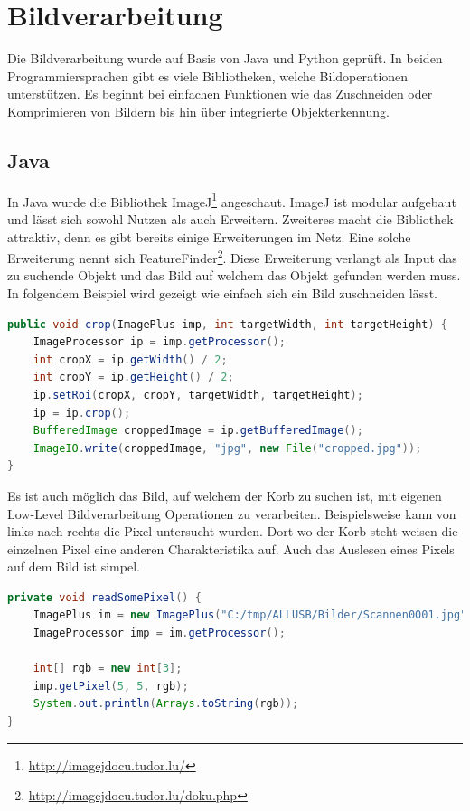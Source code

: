 \section{Bildverarbeitung}
\label{anhang-bildverarbeitung}
Die Bildverarbeitung wurde auf Basis von Java und Python geprüft. In beiden Programmiersprachen gibt es viele Bibliotheken, welche Bildoperationen unterstützen. Es beginnt bei einfachen Funktionen wie das Zuschneiden oder Komprimieren von Bildern bis hin über integrierte Objekterkennung.

\subsection{Java}
In Java wurde die Bibliothek ImageJ\footnote{\href{http://imagejdocu.tudor.lu/}{http://imagejdocu.tudor.lu/}} angeschaut. ImageJ ist modular aufgebaut und lässt sich sowohl Nutzen als auch Erweitern. Zweiteres macht die Bibliothek attraktiv, denn es gibt bereits einige Erweiterungen im Netz. Eine solche Erweiterung nennt sich FeatureFinder\footnote{\href{http://imagejdocu.tudor.lu/doku.php?id=plugin:analysis:feature_finder:start}{http://imagejdocu.tudor.lu/doku.php}}. Diese Erweiterung verlangt als Input das zu suchende Objekt und das Bild auf welchem das Objekt gefunden werden muss. In folgendem Beispiel wird gezeigt wie einfach sich ein Bild zuschneiden lässt.

\begin{lstlisting}[caption={Bild zuschneiden mit ImageJ}, language=Java]
public void crop(ImagePlus imp, int targetWidth, int targetHeight) {
	ImageProcessor ip = imp.getProcessor();
	int cropX = ip.getWidth() / 2;
	int cropY = ip.getHeight() / 2;
	ip.setRoi(cropX, cropY, targetWidth, targetHeight);
	ip = ip.crop();
	BufferedImage croppedImage = ip.getBufferedImage();
	ImageIO.write(croppedImage, "jpg", new File("cropped.jpg"));
}
\end{lstlisting}

Es ist auch möglich das Bild, auf welchem der Korb zu suchen ist, mit eigenen Low-Level Bildverarbeitung Operationen zu verarbeiten. Beispielsweise kann von links nach rechts die Pixel untersucht wurden. Dort wo der Korb steht weisen die einzelnen Pixel eine anderen Charakteristika auf. Auch das Auslesen eines Pixels auf dem Bild ist simpel.

\begin{lstlisting}[caption={Auslesen eines Pixels mit ImageJ}, language=Java]
private void readSomePixel() {
	ImagePlus im = new ImagePlus("C:/tmp/ALLUSB/Bilder/Scannen0001.jpg");
	ImageProcessor imp = im.getProcessor();

	int[] rgb = new int[3];
	imp.getPixel(5, 5, rgb);
	System.out.println(Arrays.toString(rgb));
}
\end{lstlisting}

